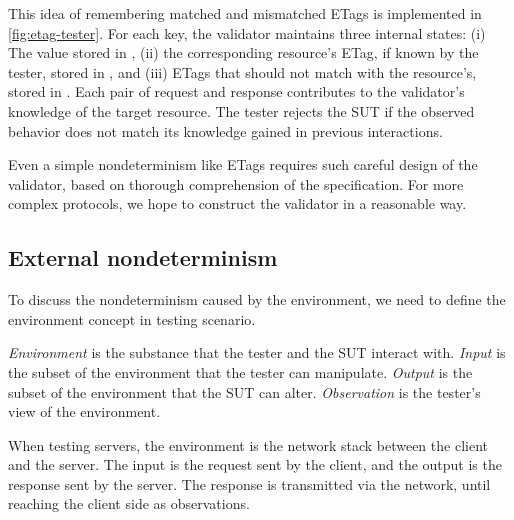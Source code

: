 This idea of remembering matched and mismatched ETags is implemented in
\autoref{fig:etag-tester}.  For each key, the validator maintains three internal
states: (i) The value stored in , (ii) the corresponding resource's
ETag, if known by the tester, stored in , and (iii) ETags that
should not match with the resource's, stored in .  Each pair of
request and response contributes to the validator's knowledge of the target
resource.  The tester rejects the SUT if the observed behavior does not match
its knowledge gained in previous interactions.

Even a simple nondeterminism like ETags requires such careful design of the
validator, based on thorough comprehension of the specification.  For more
complex protocols, we hope to construct the validator in a reasonable way.

\subsection{External nondeterminism}
To discuss the nondeterminism caused by the environment, we need to define the
environment concept in testing scenario.
\begin{definition}
  {\em Environment} is the substance that the tester and the SUT interact with.
  {\em Input} is the subset of the environment that the tester can manipulate.
  {\em Output} is the subset of the environment that the SUT can alter.  {\em
    Observation} is the tester's view of the environment.
\end{definition}
When testing servers, the environment is the network stack between the client
and the server.  The input is the request sent by the client, and the output is
the response sent by the server.  The response is transmitted via the network,
until reaching the client side as observations.

